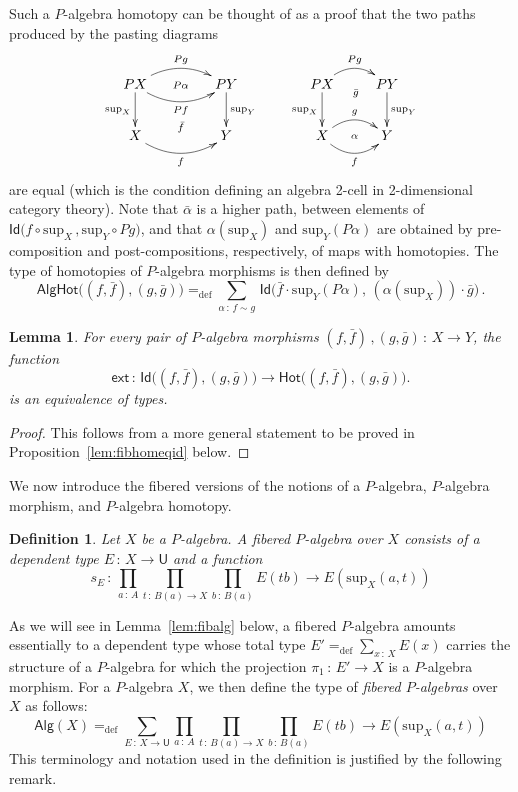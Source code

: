 \documentclass[10pt,a4paper,oneside,reqno]{amsart}
\theoremstyle{mythm}
\newtheorem{lemma}[theorem]{Lemma}
\theoremstyle{mydef}
\newtheorem{definition}[theorem]{Definition}
\theoremstyle{myrmk}
\newcommand{\defeq}{=_{\mathrm{def}}}
\newcommand{\co}{\,{:}\,}
\newcommand{\Hot}{\mathsf{Hot}}
\newcommand{\ext}{\mathsf{ext}}
\newcommand{\Id}{\mathsf{Id}}
\newcommand{\U}{\mathsf{U}}
\newcommand{\Palg}{\mathsf{Alg}}
\renewcommand{\sup}{\mathrm{sup}}
\newcommand{\AlgHot}{\mathsf{AlgHot}}
\begin{document}
Such a $P$-algebra homotopy can be thought of as a proof that the two paths produced by the pasting diagrams
\[
\xymatrix@C=1.5cm{
PX \ar@/^1pc/[r]^{Pg}   \ar[d]_{\sup_X}   \ar@/_1pc/[r]_{Pf} \ar@{}[r]|{P\alpha}
& PY \ar[d]^{\sup_Y}  \\
X  \ar@/_1pc/[r]_f  \ar@{}[r]^{\bar{f}} & Y }
\qquad
\xymatrix{
PX \ar@/^1pc/[r]^{Pg}   \ar[d]_{\sup_X} \ar@{}[r]_(.52){\bar{g}}  & PY \ar[d]^{\sup_Y}  \\
X \ar@/^1pc/[r]^g  \ar@/_1pc/[r]_f  \ar@{}[r]|{\alpha} & Y }
\]
are equal (which is the condition defining an algebra 2-cell in 2-dimensional category theory). Note that $\bar{\alpha}$ is a higher path, between elements of 
$\Id \big( f \circ \sup_X \, ,  \sup_Y \circ Pg \big)$, and that $\alpha(\sup_X)$ and $\sup_Y(P \alpha)$ are obtained by pre-composition and post-compositions, respectively, of maps with homotopies.  The type of homotopies of $P$-algebra morphisms is then defined by
\[
\AlgHot \big( (f,\bar{f}), (g, \bar{g})  \big)
 \defeq  
\sum_{\alpha \co  f \sim g} \, \Id\big( \bar{f} \cdot \sup_Y(P \alpha),\, (\alpha(\sup_X))\cdot \bar{g} \big) \, .
\]




\begin{lemma}\label{IdEqHo}
For every pair of $P$-algebra morphisms $(f, \bar{f}) \, , (g, \bar{g}) \co X \to Y$,  
the function
\[
\ext \co 
\Id\big((f, \bar{f}), (g, \bar{g})\big) \to \Hot \big((f, \bar{f}), (g, \bar{g})\big).
\]
 is an equivalence of types. 
\end{lemma}

\begin{proof}
This follows from a more general statement to be proved in Proposition~\ref{lem:fibhomeqid} below.
\end{proof}


We now introduce the fibered versions of the notions of a $P$-algebra, $P$-algebra morphism, and $P$-algebra homotopy.

\begin{definition} \label{def:fibalg}
Let $X$ be a $P$-algebra. A \emph{fibered $P$-algebra} over $X$ consists of a dependent type $E \co X \to \U$
and a function 
\[
s_E \co \prod_{a \co A} \prod_{t \co B(a) \to X}  \prod_{b \co B(a)}  E(t b)  \to E(\sup_X(a,t))
 \] 
\end{definition}


As we will see in Lemma~\ref{lem:fibalg} below, a fibered $P$-algebra amounts essentially to a dependent type whose total
type $E' \defeq \sum_{x \co X} E(x)$ carries the structure of a $P$-algebra for which the projection $\pi_1 \co E' 
\to X$ is a $P$-algebra morphism.  For a $P$-algebra $X$, we then define the type of \emph{fibered $P$-algebras} over $X$ as follows:
\[
\Palg(X) \defeq \sum_{E \co X \to \U} \prod_{a \co A} \prod_{t \co B(a) \to X} 
 \prod_{b \co B(a)}  E(t b)  \to E(\sup_X(a,t))
 \]
This terminology and notation used in the definition is justified by the following remark.
\end{document}
